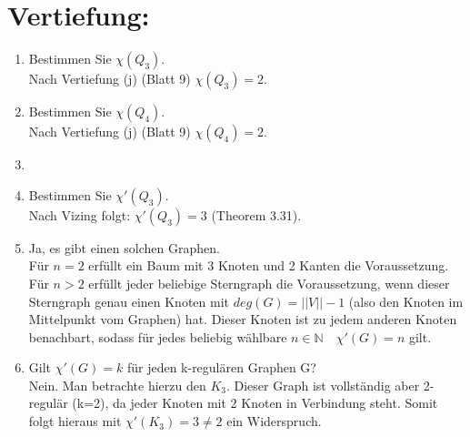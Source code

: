 

\usepackage{ tipa }
\usepackage{tikz}
\usepackage{amssymb}
\usepackage{listings}


    \maketitle
    \section*{Vertiefung:}
    \begin{enumerate}[label=(\alph*)]
        \item Bestimmen Sie $\chi(Q_3)$.\\
        Nach Vertiefung (j) (Blatt 9) $\chi (Q_3) = 2$. 
                
        \item Bestimmen Sie $\chi(Q_4)$.\\
        Nach Vertiefung (j) (Blatt 9) $\chi (Q_4) = 2$.        
                
        \item
               
        \item Bestimmen Sie $\chi'(Q_3)$.\\
        Nach Vizing folgt: $\chi'(Q_3) = 3$ (Theorem 3.31).
        
        \item
        Ja, es gibt einen solchen Graphen.\\
        Für $n=2$ erfüllt ein Baum mit 3 Knoten und 2 Kanten die Voraussetzung.
        Für $n > 2$ erfüllt jeder beliebige Sterngraph die Voraussetzung, wenn dieser Sterngraph genau einen Knoten mit $deg(G)= ||V|| - 1$ (also den Knoten im Mittelpunkt vom Graphen) hat. Dieser Knoten ist zu jedem anderen Knoten benachbart, sodass für jedes beliebig wählbare $ n \in \mathbb{N} \quad \chi'(G) = n$ gilt.  
        \item Gilt $\chi ' (G) = k $ für jeden k-regulären Graphen G? \\
        Nein. Man betrachte hierzu den $K_3$. Dieser Graph ist vollständig aber 2-regulär (k=2), da jeder Knoten mit 2 Knoten in Verbindung steht. Somit folgt hieraus mit $\chi'(K_3) = 3 \neq 2$ ein Widerspruch.
        

\end{enumerate}
